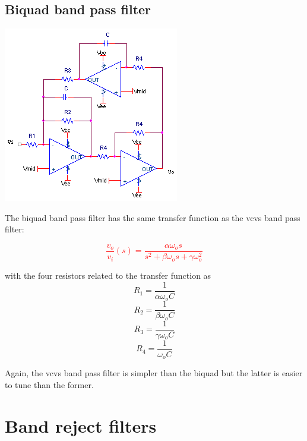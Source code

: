 \subsection{Biquad band pass filter}
\begin{center}
	\includegraphics{schematics/biquad_bandpass.PNG}
\end{center}
The biquad band pass filter has the same transfer function as the \ac{vcvs} band pass filter:

\textcolor{red}{
\begin{equation}
\frac{v_{o}}{v_{i}}(s) = \frac{\alpha \omega_{o}s}{s^{2}+\beta \omega_{o}s + \gamma \omega_{o}^{2}}
\label{eq:biquad_bandpass}
\end{equation}
}

with the four resistors related to the transfer function as
\begin{equation}
R_1 = \frac{1}{\alpha \omega_{o}C}
\end{equation}
\begin{equation}
R_2 = \frac{1}{\beta \omega_{o}C}
\end{equation}
\begin{equation}
R_3 = \frac{1}{\gamma \omega_{o}C}
\end{equation}
\begin{equation}
R_4 = \frac{1}{\omega_{o}C}
\end{equation}

Again, the \ac{vcvs} band pass filter is simpler than the biquad but the latter is easier to tune than the former. \autocite[140]{op-amp-circuits-johnson}

\section{Band reject filters}

